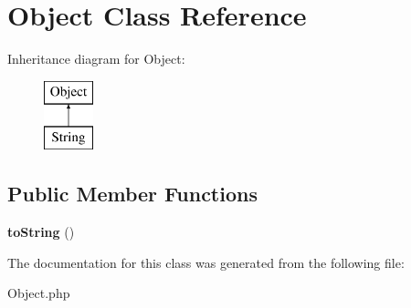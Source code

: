 \hypertarget{classObject}{
\section{Object Class Reference}
\label{classObject}
}
Inheritance diagram for Object:\begin{figure}[H]
\begin{center}
\leavevmode
\includegraphics[height=2cm]{classObject}
\end{center}
\end{figure}
\subsection*{Public Member Functions}
\begin{DoxyCompactItemize}
\item 
\hypertarget{classObject_a624c31df2f7cadf888886e0407f26bbe}{
{\bfseries toString} ()}
\label{classObject_a624c31df2f7cadf888886e0407f26bbe}

\end{DoxyCompactItemize}


The documentation for this class was generated from the following file:\begin{DoxyCompactItemize}
\item 
Object.php\end{DoxyCompactItemize}
